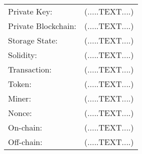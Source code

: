 \clearpage

\begin{center}
	\begin{tabular}{ p{4cm} p{8cm} }
		Private Key: & (.....TEXT....) \\
		Private Blockchain: & (.....TEXT....) \\
		Storage State: & (.....TEXT....) \\
		Solidity: & (.....TEXT....) \\
		Transaction:  & (.....TEXT....) \\
		Token: & (.....TEXT....) \\
		Miner: & (.....TEXT....) \\
		Nonce: & (.....TEXT....) \\
		On-chain: & (.....TEXT....) \\
		Off-chain: & (.....TEXT....) \\
	\end{tabular}
\end{center}






